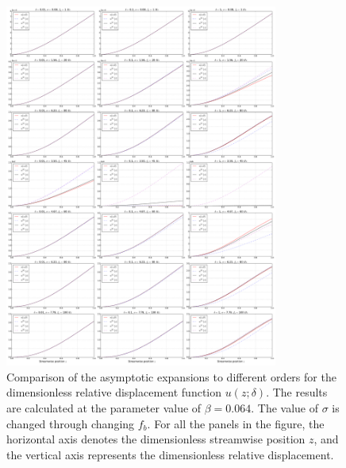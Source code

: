 \documentclass{svjour3}                     %
\begin{document}
\begin{figure}[!htbp]
    \centering
    \includegraphics[width=0.8\textwidth]{./img_eig_asy/fig_sol_analytic_disp_cmp_fr_all}
    \caption{Comparison of the asymptotic expansions to different orders for the dimensionless relative displacement function $u(z;\delta)$. The results are calculated at the parameter value of $\beta = 0.064$. The value of $\sigma$ is changed through changing $f_b$. For all the panels in the figure, the horizontal axis denotes the dimensionless streamwise position $z$, and the vertical axis represents the dimensionless relative displacement. }
    \label{fig:fig_sol_analytic_disp_cmp_fr_all}
\end{figure}
\end{document}
